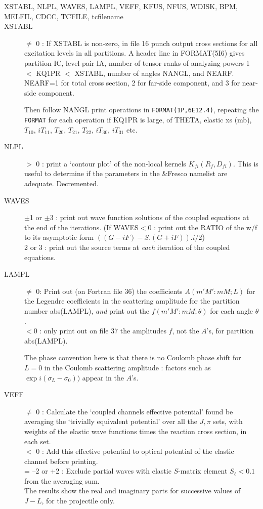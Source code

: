 \documentclass[11pt]{article}
\begin{document}
\begin{description}
\item[XSTABL, NLPL, WAVES, LAMPL, VEFF, KFUS, NFUS, WDISK, BPM, MELFIL, CDCC,  TCFILE, tcfilename]

\item[XSTABL] $\neq$ 0 : If XSTABL is non-zero, in file 16 punch output cross sections
for all excitation levels in all partitions.
A header line in FORMAT(5I6) gives partition IC, level pair IA,
number of tensor ranks of analyzing powers 1 $<$ KQ1PR $<$ XSTABL,
number of angles NANGL, and NEARF.  NEARF=1 for total cross section,
2 for far-side component, and 3 for near-side component.

Then follow NANGL print operations in
{\tt FORMAT(1P,6E12.4)}, repeating
the {\tt FORMAT} for each operation if KQ1PR is large,
of THETA, elastic xs (mb), $T_{10}$, $iT_{11}$,
$T_{20}$, $ T_{21}$, $ T_{22}$, $ iT_{30}$, $ iT_{31}$
etc.

\item[NLPL]   $>$ 0 : print a `contour plot' of the non-local kernels
$K_{fi}(R_{f},D_{fi})$.  This is useful to determine if the parameters in the \&Fresco namelist
are adequate.  Decremented.

\item[WAVES]
  $\pm$1 or $\pm$3 : print out wave function solutions of the coupled
equations at the end of the iterations.
(If WAVES$<$0 : print out the RATIO of the w/f to its asymptotic
form $((G-iF) - S.(G+iF)).i/2$)
\\  2 or 3     : print out the source terms at
{\em each} iteration of the coupled equations.



\item[LAMPL]
  $\neq$ 0: Print out (on Fortran file 36)
the coefficients $A(m'M':mM; L)$ for the Legendre
coefficients in the scattering amplitude for the partition number
abs(LAMPL),
{\em and}
print out the $f(m'M':mM; \theta)$ for each angle $\theta$.
\\ $<$0 : only print out on file 37 the amplitudes $f$, not the $A$'s,
for partition abs(LAMPL).

The phase convention here is that there is no Coulomb phase shift
for $L = 0$ in the Coulomb scattering amplitude : factors such as
$\exp i(\sigma_L-\sigma_0))$  appear in the $A$'s.


\item[VEFF]
  $\neq$ 0 : Calculate the `coupled channels effective potential'
found be averaging the `trivially equivalent potential' over all
the $J,\pi$ sets, with weights of the elastic wave functions
times the reaction cross section, in each set.
\\  $<$  0 : Add this effective potential to optical potential
of the elastic channel before printing.
\\  = --2 or +2 : Exclude partial waves with elastic $S$-matrix element
$S_\ell< 0.1$ from the averaging sum.
\\ The results show the real and imaginary parts for successive
values of $J-L$, for the projectile only.


\end{description}
\end{document}

